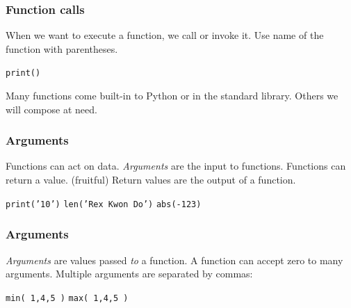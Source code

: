 \documentclass[11pt]{beamer}
\begin{document}
\begin{frame}
  \frametitle{Function calls}
  \Enlarge

  \begin{itemize}
  \myitem  When we want to execute a function, we call or invoke it. \pause
  \myitem  Use name of the function with parentheses. \pause
    \begin{itemize}
    \mysubitem  \texttt{print()}
    \end{itemize} \pause
  \myitem  Many functions come built-in to Python or in the standard library. \pause
  \myitem  Others we will compose at need.
  \end{itemize}
\end{frame}

\begin{frame}
  \frametitle{Arguments}
  \Enlarge

  \begin{itemize}
  \myitem  Functions can act on data. \pause
  \myitem  \emph{Arguments} are the input to functions. \pause
  \myitem  Functions can return a value.  (fruitful) \pause
  \myitem  Return values are the output of a function. \pause
    \begin{itemize}
    \mysubitem  \texttt{print('10')} \pause
    \mysubitem  \texttt{len('Rex Kwon Do')} \pause
    \mysubitem  \texttt{abs(-123)}
    \end{itemize}
  \end{itemize}
\end{frame}

\begin{frame}
  \frametitle{Arguments}
  \Enlarge

  \begin{itemize}
  \myitem  \emph{Arguments} are values passed \emph{to} a function. \pause
  \myitem  A function can accept zero to many arguments. \pause
  \myitem  Multiple arguments are separated by commas:
    \begin{itemize}
    \mysubitem  \texttt{min( 1,4,5 )}
    \mysubitem  \texttt{max( 1,4,5 )}
    \end{itemize}
  \end{itemize}
\end{frame}
\end{document}
